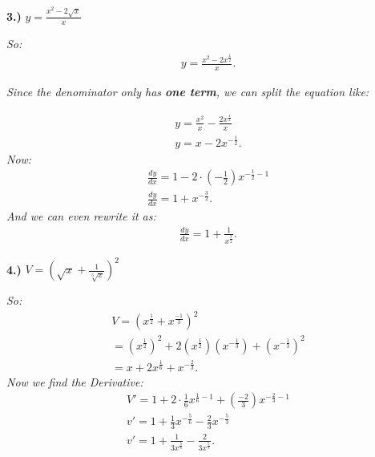 \documentclass{report}
\begin{document}
  \begin{mdframed}
    \textbf{3.)} $y = \frac{x^2 - 2 \sqrt{x}}{x}$
  \end{mdframed}
  \bigbreak \noindent 
  \textit{So:}
  \begin{align*}
      y = \frac{x^2 - 2 x^{\frac{1}{2}}}{x}
  .\end{align*}
  \bigbreak \noindent 
  \begin{center}
    \textit{Since the denominator only has \textbf{one term}, we can split the equation like:}
  \end{center}
  \begin{align*}
    y = \frac{x^2}{x} - \frac{2x^{ \frac{1}{2}}}{x} \\ 
    y = x - 2x^{- \frac{1}{2}}
  .\end{align*}
  \bigbreak \noindent 
  \textit{Now:}
  \begin{align*}
    \frac{dy}{dx} = 1 - 2 \cdot (-\frac{1}{2})x^{- \frac{1}{2} - 1} \\ 
    \frac{dy}{dx} = 1 + x^{- \frac{3}{2}}
  .\end{align*}
  \bigbreak \noindent 
  \textit{And we can even rewrite it as:}
  \begin{align*}
    \frac{dy}{dx} = 1 + \frac{1}{x^{ \frac{3}{2}}}  
  .\end{align*}
  
  \bigbreak \noindent \bigbreak \noindent  
  \begin{mdframed}
    \textbf{4.)} $ V = ( \sqrt{x} + \frac{1}{ \sqrt[3]{x}})^2$
  \end{mdframed}
  \bigbreak \noindent 
  \textit{So:}
  \begin{align*}
    V = (x^{ \frac{1}{2}} + x^{ \frac{-1}{3}})^2 \\ 
    = (x^{ \frac{1}{2}})^2  + 2(x^{ \frac{1}{2}})(x^{- \frac{1}{3}}) + (x^{- \frac{1}{3}})^2 \\
    = x + 2x^{ \frac{1}{6}} + x^{ - \frac{2}{3}}
  .\end{align*}
  \bigbreak \noindent 
  \textit{Now we find the Derivative:}
  \begin{align*}
    V\prime = 1 + 2 \cdot \frac{1}{6} x^{ \frac{1}{6} - 1} + ( \frac{-2}{3})x^{- \frac{2}{3} -1} \\ 
    v\prime = 1 +  \frac{1}{3}x^{- \frac{5}{6}} - \frac{2}{3}x^{- \frac{5}{3}} \\ 
    v\prime = 1 + \frac{1}{3x^{ \frac{5}{6}}} - \frac{2}{3x^{ \frac{5}{3}}}
  .\end{align*}
\end{document}
